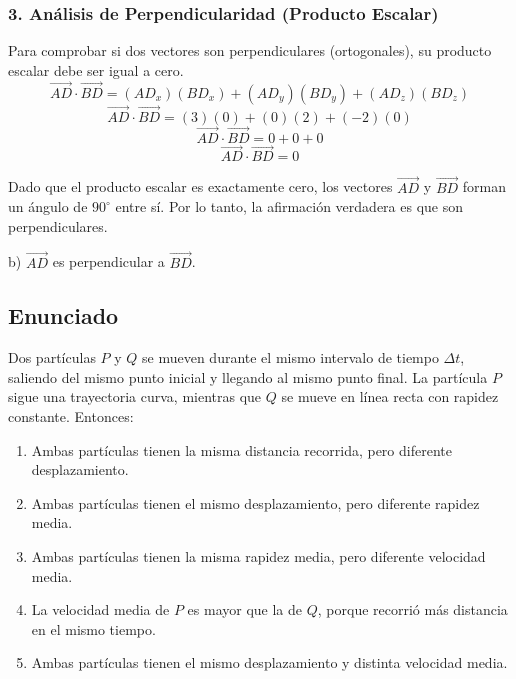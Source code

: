\documentclass[12pt, a4paper]{article}
\begin{document}
\subsubsection*{3. Análisis de Perpendicularidad (Producto Escalar)}
Para comprobar si dos vectores son perpendiculares (ortogonales), su producto escalar debe ser igual a cero.
$$ \vec{AD} \cdot \vec{BD} = (AD_x)(BD_x) + (AD_y)(BD_y) + (AD_z)(BD_z) $$
$$ \vec{AD} \cdot \vec{BD} = (3)(0) + (0)(2) + (-2)(0) $$
$$ \vec{AD} \cdot \vec{BD} = 0 + 0 + 0 $$
$$ \vec{AD} \cdot \vec{BD} = 0 $$

Dado que el producto escalar es exactamente cero, los vectores $\vec{AD}$ y $\vec{BD}$ forman un ángulo de $90^\circ$ entre sí. Por lo tanto, la afirmación verdadera es que son perpendiculares.

\begin{tcolorbox}[colback=green!5!white, colframe=green!50!black, title=Respuesta Final]
\centering \Large b) $\vec{AD}$ es perpendicular a $\vec{BD}$.
\end{tcolorbox}

\newpage

\subsection*{Enunciado}
Dos partículas $P$ y $Q$ se mueven durante el mismo intervalo de tiempo $\Delta t$, saliendo del mismo punto inicial y llegando al mismo punto final. La partícula $P$ sigue una trayectoria curva, mientras que $Q$ se mueve en línea recta con rapidez constante. Entonces:

\begin{enumerate}[label=\alph*)]
    \item Ambas partículas tienen la misma distancia recorrida, pero diferente desplazamiento.
    \item Ambas partículas tienen el mismo desplazamiento, pero diferente rapidez media.
    \item Ambas partículas tienen la misma rapidez media, pero diferente velocidad media.
    \item La velocidad media de $P$ es mayor que la de $Q$, porque recorrió más distancia en el mismo tiempo.
    \item Ambas partículas tienen el mismo desplazamiento y distinta velocidad media.
\end{enumerate}
\end{document}
